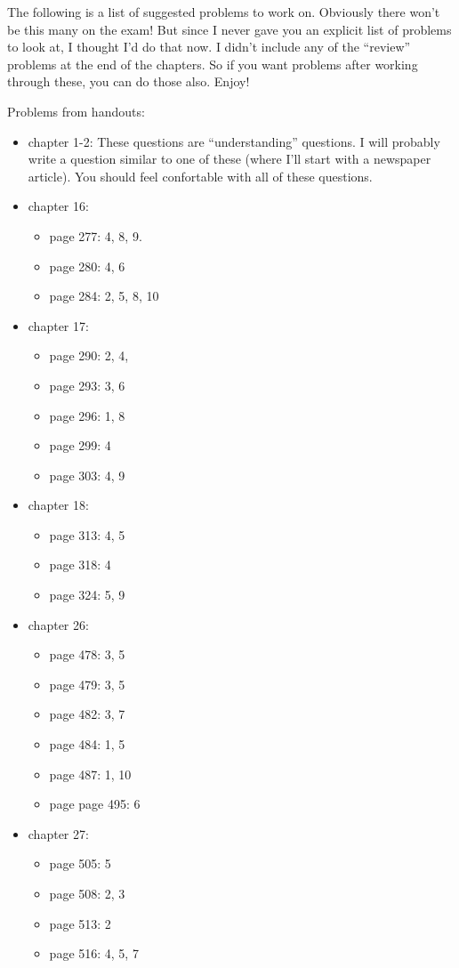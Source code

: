 \documentclass[12pt]{article}
\begin{document}
The following is a list of suggested problems to work on.  Obviously
there won't be this many on the exam!  But since I never gave you an
explicit list of problems to look at, I thought I'd do that now.  I
didn't include any of the  ``review'' problems at the end of the
chapters.  So if you want problems after working through these, you
can do those also.  Enjoy!

Problems from handouts:
\begin{itemize}
\item chapter 1-2: These questions are ``understanding'' questions.  I
will probably write a question similar to one of these (where I'll
start with a newspaper article).  You should feel confortable with all
of these questions.
\item chapter 16: 
  \begin{itemize}
  \item page 277: 4,  8, 9.
  \item page 280: 4, 6
  \item page 284: 2, 5, 8, 10
  \end{itemize}
\item chapter 17: 
  \begin{itemize}
  \item page 290: 2, 4,
  \item page 293: 3, 6
  \item page 296: 1, 8
  \item page 299: 4
  \item page 303: 4, 9
  \end{itemize}
\item chapter 18:
  \begin{itemize}
  \item page 313: 4, 5
  \item page 318: 4
  \item page 324: 5, 9
  \end{itemize}
\item chapter 26: 
\begin{itemize}
\item page 478: 3, 5
\item page 479: 3, 5
\item page 482: 3, 7
\item page 484: 1, 5
\item page 487: 1, 10
\item page page 495: 6
\end{itemize}
\item chapter 27:
  \begin{itemize}
  \item page 505: 5
  \item page 508: 2, 3
  \item page 513: 2
  \item page 516: 4, 5, 7
  \end{itemize}
\end{itemize}
\end{document}
